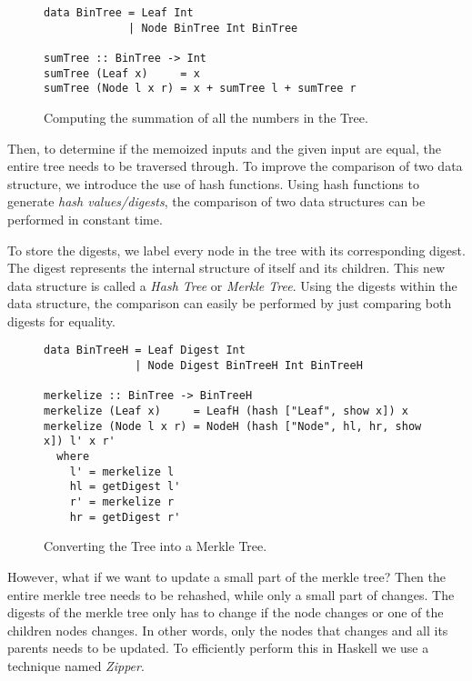 \begin{figure}[H]
\captionsetup{justification=justified,singlelinecheck=false,margin=0cm}
\begin{verbatim}
data BinTree = Leaf Int
             | Node BinTree Int BinTree

sumTree :: BinTree -> Int
sumTree (Leaf x)     = x
sumTree (Node l x r) = x + sumTree l + sumTree r
\end{verbatim}
\caption{Computing the summation of all the numbers in the Tree.}
\label{fig-bin-tree}
\end{figure}

Then, to determine if the memoized inputs and the given input are equal, the entire tree needs to be traversed through. To improve the comparison of two data structure, we introduce the use of hash functions. Using hash functions to generate \textit{hash values/digests}, the comparison of two data structures can be performed in constant time.

To store the digests, we label every node in the tree with its corresponding digest. The digest represents the internal structure of itself and its children. This new data structure is called a \textit{Hash Tree} or \textit{Merkle Tree}\cite{merkle1987digital}. Using the digests within the data structure, the comparison can easily be performed by just comparing both digests for equality.

\begin{figure}[H]
\captionsetup{justification=justified,singlelinecheck=false,margin=0cm}
\begin{verbatim}
data BinTreeH = Leaf Digest Int
              | Node Digest BinTreeH Int BinTreeH

merkelize :: BinTree -> BinTreeH
merkelize (Leaf x)     = LeafH (hash ["Leaf", show x]) x
merkelize (Node l x r) = NodeH (hash ["Node", hl, hr, show x]) l' x r'
  where
    l' = merkelize l
    hl = getDigest l'
    r' = merkelize r
    hr = getDigest r'
\end{verbatim}
\caption{Converting the Tree into a Merkle Tree.}
\label{fig-conv-tree}
\end{figure}

However, what if we want to update a small part of the merkle tree? Then the entire merkle tree needs to be rehashed, while only a small part of changes. The digests of the merkle tree only has to change if the node changes or one of the children nodes changes. In other words, only the nodes that changes and all its parents needs to be updated. To efficiently perform this in Haskell we use a technique named \textit{Zipper}\cite{huet1997zipper}.  

